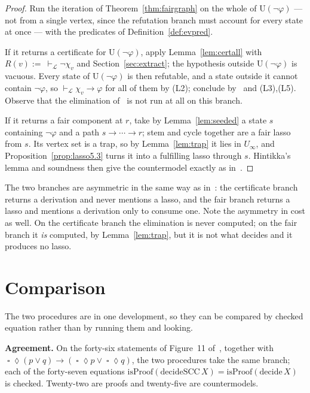 \documentclass[11pt,a4paper]{article}
\theoremstyle{definition}
\newcommand{\Always}{\mathop{\square}}
\newcommand{\Event}{\mathop{\lozenge}}
\newcommand{\Ust}{\mathrm{U}}
\newcommand{\proves}{\vdash_{\mathcal{L}}}
\begin{document}
\begin{proof}
Run the iteration of Theorem~\ref{thm:fairgraph} on the whole of
$\Ust(\neg\varphi)$ --- not from a single vertex, since the refutation branch
must account for every state at once --- with the predicates of
Definition~\ref{def:evpred}.

If it returns a certificate for $\Ust(\neg\varphi)$, apply
Lemma~\ref{lem:certall} with $R(v):=\ \proves\neg\chi_v$ and
Section~\ref{sec:extract}; the hypothesis outside $\Ust(\neg\varphi)$ is
vacuous.  Every state of $\Ust(\neg\varphi)$ is then refutable, and a state
outside it cannot contain $\neg\varphi$, so $\proves\chi_v\to\varphi$ for all
of them by (L2); conclude by~\cite[Lem.~2.5]{m4} and (L3),(L5).  Observe that
the elimination of~\cite{m4} is not run at all on this branch.

If it returns a fair component at $r$, take by Lemma~\ref{lem:seeded} a state
$s$ containing $\neg\varphi$ and a path $s\to\cdots\to r$; stem and cycle
together are a fair lasso from $s$.  Its vertex set is a trap, so by
Lemma~\ref{lem:trap} it lies in $U_\infty$, and
Proposition~\ref{prop:lasso5.3} turns it into a fulfilling lasso through $s$.
Hintikka's lemma and soundness then give the countermodel exactly as
in~\cite[Thm.~6.1]{m4}.
\end{proof}

The two branches are asymmetric in the same way as in~\cite{m4}: the
certificate branch returns a derivation and never mentions a lasso, and the
fair branch returns a lasso and mentions a derivation only to consume one.
Note the asymmetry in cost as well.  On the certificate branch the elimination
is never computed; on the fair branch it \emph{is} computed, by
Lemma~\ref{lem:trap}, but it is not what decides and it produces no lasso.

\section{Comparison}\label{sec:compare}

The two procedures are in one development, so they can be compared by checked
equation rather than by running them and looking.

\medskip\noindent\textbf{Agreement.}  On the forty-six statements of Figure~11
of~\cite{sgl}, together with
$\Always\Event(p\vee q)\to(\Always\Event p\vee\Always\Event q)$, the two
procedures take the same branch; each of the forty-seven equations
$\mathrm{isProof}(\mathrm{decideSCC}\,X)=\mathrm{isProof}(\mathrm{decide}\,X)$
is checked.  Twenty-two are proofs and twenty-five are countermodels.
\end{document}
